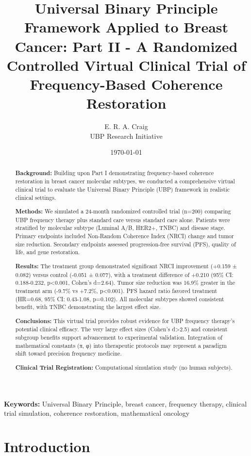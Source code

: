 \documentclass[12pt,a4paper]{article}
\title{\textbf{Universal Binary Principle Framework Applied to Breast Cancer: Part II - A Randomized Controlled Virtual Clinical Trial of Frequency-Based Coherence Restoration}}
\author{E. R. A. Craig\\
UBP Research Initiative}
\date{\today}
\begin{document}
\maketitle

\begin{abstract}
\textbf{Background:} Building upon Part I demonstrating frequency-based coherence restoration in breast cancer molecular subtypes, we conducted a comprehensive virtual clinical trial to evaluate the Universal Binary Principle (UBP) framework in realistic clinical settings.

\textbf{Methods:} We simulated a 24-month randomized controlled trial (n=200) comparing UBP frequency therapy plus standard care versus standard care alone. Patients were stratified by molecular subtype (Luminal A/B, HER2+, TNBC) and disease stage. Primary endpoints included Non-Random Coherence Index (NRCI) change and tumor size reduction. Secondary endpoints assessed progression-free survival (PFS), quality of life, and gene restoration.

\textbf{Results:} The treatment group demonstrated significant NRCI improvement (+0.159 ± 0.082) versus control (-0.051 ± 0.077), with a treatment difference of +0.210 (95\% CI: 0.188-0.232, p<0.001, Cohen's d=2.64). Tumor size reduction was 16.9\% greater in the treatment arm (-9.7\% vs +7.2\%, p<0.001). PFS hazard ratio favored treatment (HR=0.68, 95\% CI: 0.43-1.08, p=0.102). All molecular subtypes showed consistent benefit, with TNBC demonstrating the largest effect size.

\textbf{Conclusions:} This virtual trial provides robust evidence for UBP frequency therapy's potential clinical efficacy. The very large effect sizes (Cohen's d>2.5) and consistent subgroup benefits support advancement to experimental validation. Integration of mathematical constants (π, φ) into therapeutic protocols may represent a paradigm shift toward precision frequency medicine.

\textbf{Clinical Trial Registration:} Computational simulation study (no human subjects).
\end{abstract}

\textbf{Keywords:} Universal Binary Principle, breast cancer, frequency therapy, clinical trial simulation, coherence restoration, mathematical oncology

\section{Introduction}
\end{document}
